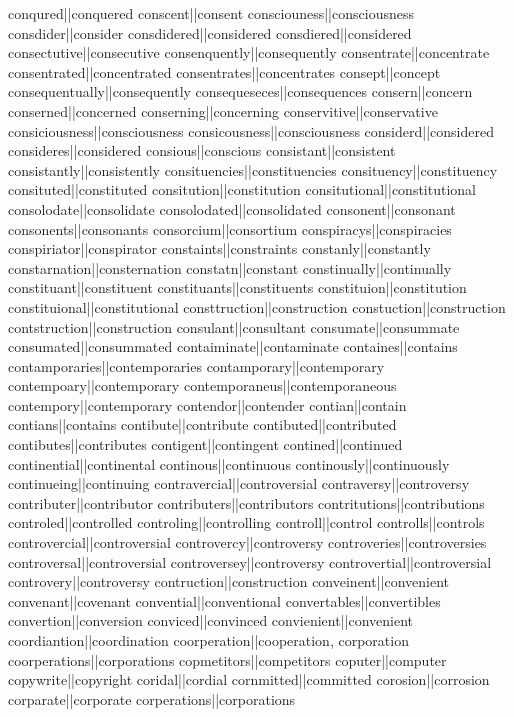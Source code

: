 conqured||conquered
conscent||consent
consciouness||consciousness
consdider||consider
consdidered||considered
consdiered||considered
consectutive||consecutive
consenquently||consequently
consentrate||concentrate
consentrated||concentrated
consentrates||concentrates
consept||concept
consequentually||consequently
consequeseces||consequences
consern||concern
conserned||concerned
conserning||concerning
conservitive||conservative
consiciousness||consciousness
consicousness||consciousness
considerd||considered
consideres||considered
consious||conscious
consistant||consistent
consistantly||consistently
consituencies||constituencies
consituency||constituency
consituted||constituted
consitution||constitution
consitutional||constitutional
consolodate||consolidate
consolodated||consolidated
consonent||consonant
consonents||consonants
consorcium||consortium
conspiracys||conspiracies
conspiriator||conspirator
constaints||constraints
constanly||constantly
constarnation||consternation
constatn||constant
constinually||continually
constituant||constituent
constituants||constituents
constituion||constitution
constituional||constitutional
consttruction||construction
constuction||construction
contstruction||construction
consulant||consultant
consumate||consummate
consumated||consummated
contaiminate||contaminate
containes||contains
contamporaries||contemporaries
contamporary||contemporary
contempoary||contemporary
contemporaneus||contemporaneous
contempory||contemporary
contendor||contender
contian||contain
contians||contains
contibute||contribute
contibuted||contributed
contibutes||contributes
contigent||contingent
contined||continued
continential||continental
continous||continuous
continously||continuously
continueing||continuing
contravercial||controversial
contraversy||controversy
contributer||contributor
contributers||contributors
contritutions||contributions
controled||controlled
controling||controlling
controll||control
controlls||controls
controvercial||controversial
controvercy||controversy
controveries||controversies
controversal||controversial
controversey||controversy
controvertial||controversial
controvery||controversy
contruction||construction
conveinent||convenient
convenant||covenant
convential||conventional
convertables||convertibles
convertion||conversion
conviced||convinced
convienient||convenient
coordiantion||coordination
coorperation||cooperation, corporation
coorperations||corporations
copmetitors||competitors
coputer||computer
copywrite||copyright
coridal||cordial
cornmitted||committed
corosion||corrosion
corparate||corporate
corperations||corporations
